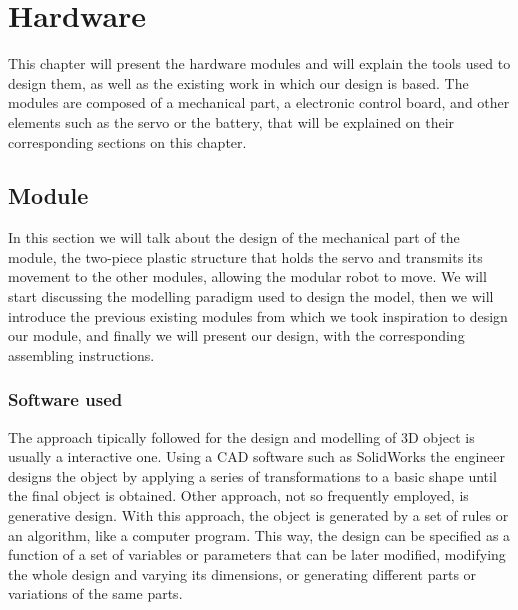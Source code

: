 \chapter{Hardware}
\label{hardware_chapter}

This chapter will present the hardware modules and will explain the tools used to design them, as well as the existing work in which our design is based. The modules are composed of a mechanical part, a electronic control board, and other elements such as the servo or the battery, that will be explained on their corresponding sections on this chapter.\\

\section{Module}
\label{hardware_module}
In this section we will talk about the design of the mechanical part of the module, the two-piece plastic structure that holds the servo and transmits its movement to the other modules, allowing the modular robot to move. We will start discussing the modelling paradigm used to design the model, then we will introduce the previous existing modules from which we took inspiration to design our module, and finally we will present our design, with the corresponding assembling instructions.\\

\subsection{Software used}
\label{hardware_software_used}

The approach tipically followed for the design and modelling of 3D object is usually a interactive one. Using a CAD software such as SolidWorks the engineer designs the object by applying a series of transformations to a basic shape until the final object is obtained. Other approach, not so frequently employed, is generative design. With this approach, the object is generated by a set of rules or an algorithm, like a computer program. This way, the design can be specified as a function of a set of variables or parameters that can be later modified, modifying the whole design and varying its dimensions, or generating different parts or variations of the same parts. \\

